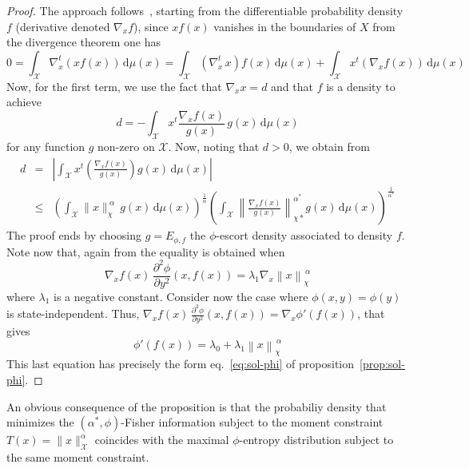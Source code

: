 \documentclass[entropy,article,submit,moreauthors,pdftex]{Definitions/mdpi}
\def\dmu{\mathrm{d}\mu}%
\def\X{\mathcal{X}}%
\begin{document}
\begin{proof}
  The   approach   follows~\cite{Ber13},   starting  from   the   differentiable
  probability  density $f$  (derivative denoted  $\nabla_x f$),  since $x  f(x)$
  vanishes in the boundaries of $X$ from the divergence theorem one has
  \[
  0  = \int_\X  \nabla_x^t \left(  x f(x)  \right) \,  \dmu(x) =  \int_\X \left(
  \nabla_x^t \,  x \right) f(x)  \, \dmu(x) +  \int_\X x^t \left(  \nabla_x f(x)
  \right) \, \dmu(x)
  \]
  Now, for the first term, we use the fact that $\nabla_x x = d$ and that $f$ is
  a density to achieve
  \[
  d = - \int_\X x^t \frac{\nabla_x f(x)}{g(x)} \, g(x) \, \dmu(x)
  \]
  for any function  $g$ non-zero on $\X$.   Now, noting that $d >  0$, we obtain
  from \cite[Lemma~2]{Ber13}
  \begin{eqnarray*}
  d  & = & \left|  \int_\X x^t  \left(  \frac{\nabla_x f(x)}{g(x)}  \right) g(x)  \,
  \dmu(x) \right|
  \\[2.5mm]
  & \le &  \left( \int_\X \|x\|_\chi^{\: \alpha} \,  g(x) \, \dmu(x)
  \right)^{\frac{1}{\alpha}}     \left(    \int_\X     \left\|    \frac{\nabla_x
    f(x)}{g(x)}\right\|_{\chi*}^{\alpha^*}        g(x)         \,        \dmu(x)
  \right)^{\frac{1}{\alpha^*}}
  \end{eqnarray*}
  The  proof  ends  by  choosing  $g =  E_{\phi,f}$  the  $\phi$-escort  density
  associated to density $f$. Note now that, again from \cite[Lemma~2]{Ber13} the
  equality is obtained when
  \[
  \nabla_x  f(x) \,  \frac{\partial^2 \phi}{\partial  y^2} (x,f(x))  = \lambda_1
  \nabla_x \left\| x \right\|_\chi^{\, \alpha}
  \]
  where  $\lambda_1$  is a  negative  constant.   Consider  now the  case  where
  $\phi(x,y)  =   \phi(y)$  is  state-independent.   Thus,   $\nabla_x  f(x)  \,
  \frac{\partial^2 \phi}{\partial  y^2} (x,f(x))  = \nabla_x  \phi'(f(x))$, that
  gives
  \[
  \phi'(f(x)) = \lambda_0 + \lambda_1 \left\| x \right\|_\chi^{\, \alpha}
  \]
  This  last   equation  has   precisely  the  form   eq.~\eqref{eq:sol-phi}  of
  proposition~\ref{prop:sol-phi}.
\end{proof}
%
An obvious  consequence of the proposition  is that the probabiliy  density that
minimizes  the  $(\alpha^*,\phi)$-Fisher  information   subject  to  the  moment
constraint $T(x)  = \|x\|_\X^\alpha$  coincides with the  maximal $\phi$-entropy
distribution subject to the same moment constraint.
\end{document}
